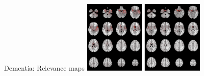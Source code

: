 \documentclass[c]{beamer}
\begin{document}
	\begin{frame}{Dementia: Relevance maps} %
		\vfill
		\centering
		\newcommand{\width}{3cm}
		\includegraphics[width=\width]{data/1398_1.png}
		\includegraphics[width=\width]{data/1504_1.png}

\end{frame}
\end{document}

